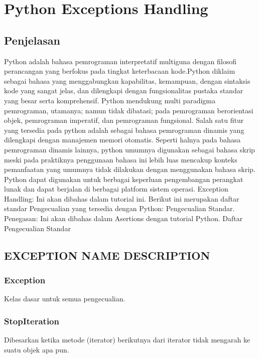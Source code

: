 
                                  \section{Python Exceptions Handling}

\subsection{Penjelasan}
Python adalah bahasa pemrograman interpretatif multiguna dengan filosofi perancangan yang berfokus pada tingkat keterbacaan kode.Python diklaim sebagai bahasa yang menggabungkan kapabilitas, kemampuan, dengan sintaksis kode yang sangat jelas, dan dilengkapi dengan fungsionalitas pustaka standar yang besar serta komprehensif.
Python mendukung multi paradigma pemrograman, utamanya; namun tidak dibatasi; pada pemrograman berorientasi objek, pemrograman imperatif, dan pemrograman fungsional. Salah satu fitur yang tersedia pada python adalah sebagai bahasa pemrograman dinamis yang dilengkapi dengan manajemen memori otomatis. Seperti halnya pada bahasa pemrograman dinamis lainnya, python umumnya digunakan sebagai bahasa skrip meski pada praktiknya penggunaan bahasa ini lebih luas mencakup konteks pemanfaatan yang umumnya tidak dilakukan dengan menggunakan bahasa skrip. Python dapat digunakan untuk berbagai keperluan pengembangan perangkat lunak dan dapat berjalan di berbagai platform sistem operasi.
Exception Handling: Ini akan dibahas dalam tutorial ini. Berikut ini merupakan daftar standar Pengecualian yang tersedia dengan Python: Pengecualian Standar.
Penegasan: Ini akan dibahas dalam Asertions dengan tutorial Python. 
Daftar Pengecualian Standar 
\subsection{EXCEPTION NAME DESCRIPTION}

\subsubsection{Exception}
Kelas dasar untuk semua pengecualian.

\subsubsection{StopIteration}
Dibesarkan ketika metode (iterator) berikutnya dari iterator tidak mengarah ke suatu objek apa pun.

